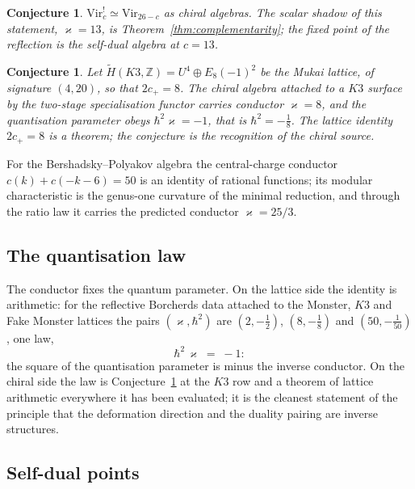 \documentclass[11pt]{amsart}
\numberwithin{equation}{section}
\theoremstyle{plain}
\newtheorem{conjecture}[theorem]{Conjecture}
\theoremstyle{definition}
\theoremstyle{remark}
\newcommand{\bZ}{\mathbb{Z}}
\newcommand{\Vir}{\mathrm{Vir}}
\begin{document}
\begin{conjecture}\label{conj:reflection}
$\Vir_c^{!}\simeq\Vir_{26-c}$ as chiral algebras. The scalar shadow of
this statement, $\varkappa=13$, is Theorem~\ref{thm:complementarity};
the fixed point of the reflection is the self-dual algebra at
$c=13$.
\end{conjecture}

\begin{conjecture}\label{conj:mukai}
Let $\widetilde H(K3,\bZ)=U^{4}\oplus E_8(-1)^{2}$ be the Mukai lattice,
of signature $(4,20)$, so that $2c_{+}=8$. The chiral algebra attached to
a $K3$ surface by the two-stage specialisation functor carries conductor
$\varkappa=8$, and the quantisation parameter obeys
$\hbar^{2}\varkappa=-1$, that is $\hbar^{2}=-\tfrac18$. The lattice
identity $2c_+=8$ is a theorem; the conjecture is the recognition of
the chiral source.
\end{conjecture}

For the Bershadsky--Polyakov algebra the central-charge conductor
$c(k)+c(-k-6)=50$ is an identity of rational functions; its modular
characteristic is the genus-one curvature of the minimal reduction,
and through the ratio law it carries the predicted conductor
$\varkappa=25/3$.

\subsection{The quantisation law}

The conductor fixes the quantum parameter. On the lattice side the
identity is arithmetic: for the reflective Borcherds data attached to
the Monster, $K3$ and Fake Monster lattices the pairs
$(\varkappa,\hbar^{2})$ are $(2,-\tfrac12)$, $(8,-\tfrac18)$ and
$(50,-\tfrac1{50})$, one law,
\begin{equation}
\hbar^{2}\,\varkappa\;=\;-1 :
\end{equation}
the square of the quantisation parameter is minus the inverse
conductor. On the chiral side the law is
Conjecture~\ref{conj:mukai} at the $K3$ row and a theorem of lattice
arithmetic everywhere it has been evaluated; it is the cleanest
statement of the principle that the deformation direction and the
duality pairing are inverse structures.

\subsection{Self-dual points}
\end{document}
